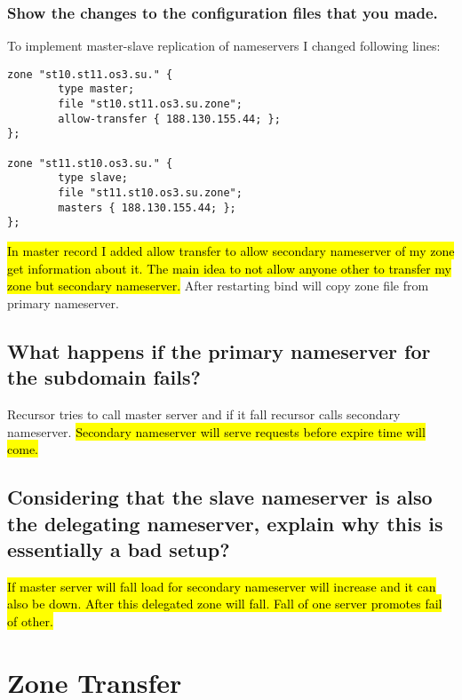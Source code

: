 \documentclass[a4paper,11pt]{article}
\begin{document}
\subsubsection{Show the changes to the configuration files that you made.}
To implement master-slave replication of nameservers I changed following lines:
\begin{lstlisting}[caption=named.conf]
zone "st10.st11.os3.su." {
        type master;
        file "st10.st11.os3.su.zone";
        allow-transfer { 188.130.155.44; };
};

zone "st11.st10.os3.su." {
        type slave;
        file "st11.st10.os3.su.zone";
        masters { 188.130.155.44; };
};
\end{lstlisting}
\hl{In master record I added allow transfer to allow secondary nameserver of my zone get information about it. The main idea to not allow anyone other to transfer my zone but secondary nameserver.} After restarting bind will copy zone file from primary nameserver.

\subsection{What happens if the primary nameserver for the subdomain fails?}
Recursor tries to call master server and if it fall recursor calls secondary nameserver. \hl{Secondary nameserver will serve requests before expire time will come.}


\subsection{Considering that the slave nameserver is also the delegating nameserver, explain why this is essentially a bad setup?}

\hl{If master server will fall load for secondary nameserver will increase and it can also be down. After this delegated zone will fall. Fall of one server promotes fail of other.}

\section{Zone Transfer}
\addtocounter{subsection}{7}
\subsection{}
\end{document}
